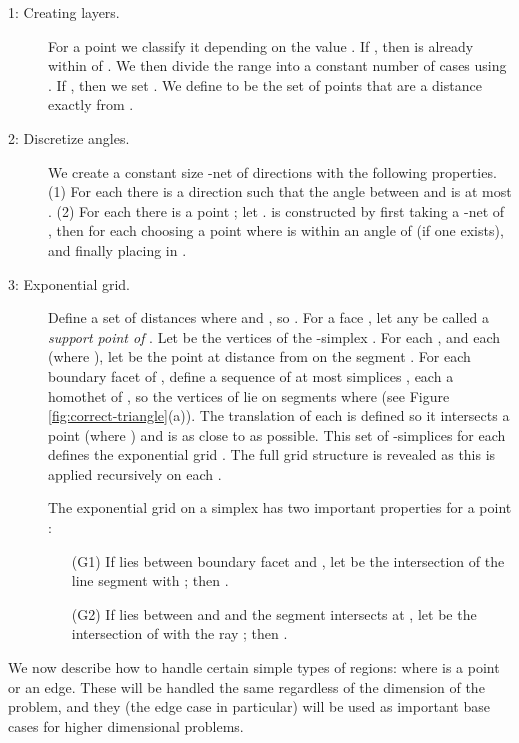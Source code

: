 \documentclass[11pt]{myclass}
\begin{document}
\begin{description} \denselist
\item[1: Creating layers.]
For a point  we classify it depending on the value .  If , then  is already within  of .  We then divide the range  into a constant  number of cases using .  If , then we set .  We define  to be the set of points that are a distance exactly  from .  
\vspace{1mm}

\item[2: Discretize angles.]
We create a constant size -net  of directions with the following properties.
(1) For each  there is a direction  such that the angle between  and  is at most .
(2) For each  there is a point ; let .  
 is constructed by first taking a -net  of , then for each  choosing a point  where  is within an angle  of  (if one exists), and finally placing  in .  
\vspace{1mm}

\item[3: Exponential grid.]
Define a set  of distances where  and , so .  
For a face , let any  be called a \emph{support point of }.  
Let  be the vertices of the -simplex .  For each , and each  (where ), let  be the point at distance  from  on the segment .  
For each boundary facet  of , define a sequence of at most  simplices , each a homothet of , so the vertices of  lie on segments  where  (see Figure \ref{fig:correct-triangle}(a)).  
The translation of each  is defined so it intersects a point  (where ) and is as close to  as possible.  This set of -simplices for each  defines the exponential grid .
The full grid structure is revealed as this is applied recursively on each .  



The exponential grid  on a simplex  has two important properties for a point :  
\begin{itemize} \denselist
\item[(G1)] If  lies between boundary facet  and , let  be the intersection of the line segment  with ; then .
\item[(G2)] If  lies between  and  and the segment  intersects  at , let  be the intersection of  with the ray ; then .  
\end{itemize}
\end{description}


We now describe how to handle certain simple types of regions: where  is a point or an edge.  These will be handled the same regardless of the dimension of the problem, and they (the edge case in particular) will be used as important base cases for higher dimensional problems.  
\end{document}
